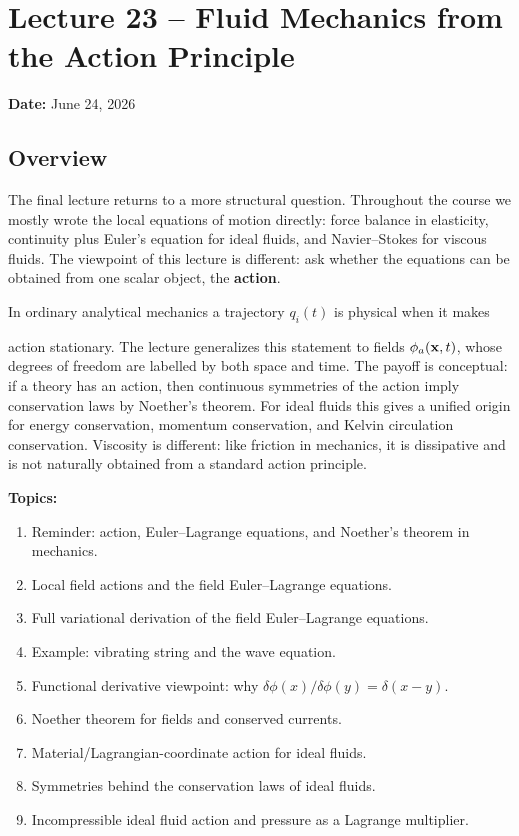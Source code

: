 \documentclass[../main.tex]{subfiles}
\begin{document}
\section{Lecture 23 -- Fluid Mechanics from the Action Principle}\label{sec:lec23}
\begin{center}
  \textbf{Date:} June 24, 2026
\end{center}

\subsection*{Overview}
The final lecture returns to a more structural question.  Throughout the course
we mostly wrote the local equations of motion directly: force balance in
elasticity, continuity plus Euler's equation for ideal fluids, and
Navier--Stokes for viscous fluids.  The viewpoint of this lecture is different:
ask whether the equations can be obtained from one scalar object, the
\textbf{action}.

In ordinary analytical mechanics a trajectory $q_i(t)$ is physical when it makes

action stationary.  The lecture generalizes this statement to fields
$\phi_a(\mathbf{x},t)$, whose degrees of freedom are labelled by both space and
time.  The payoff is conceptual: if a theory has an action, then continuous
symmetries of the action imply conservation laws by Noether's theorem.
For ideal fluids this gives a unified origin for energy conservation, momentum
conservation, and Kelvin circulation conservation.  Viscosity is different:
like friction in mechanics, it is dissipative and is not naturally obtained from
a standard action principle.

\medskip\noindent\textbf{Topics:}
\begin{enumerate}
  \item Reminder: action, Euler--Lagrange equations, and Noether's theorem in
    mechanics.
  \item Local field actions and the field Euler--Lagrange equations.
  \item Full variational derivation of the field Euler--Lagrange equations.
  \item Example: vibrating string and the wave equation.
  \item Functional derivative viewpoint: why
    $\delta\phi(x)/\delta\phi(y)=\delta(x-y)$.
  \item Noether theorem for fields and conserved currents.
  \item Material/Lagrangian-coordinate action for ideal fluids.
  \item Symmetries behind the conservation laws of ideal fluids.
  \item Incompressible ideal fluid action and pressure as a Lagrange multiplier.
\end{enumerate}
\end{document}
